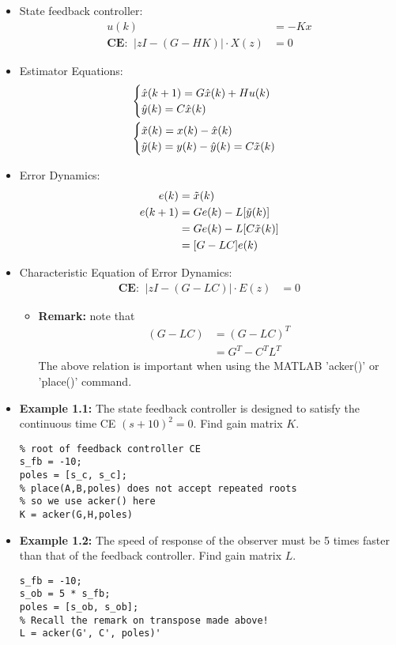 \begin{itemize}
    \item State feedback controller:
    \begin{align*}
        u(k)&=-Kx \\
        \textbf{CE:} \; \; \left|zI-(G-HK)\right|\cdot X(z)&=0
    \end{align*}
    \item Estimator Equations:
    \begin{align*}
        &\begin{cases}
            \hat{x}(k+1) = G \hat{x}(k)+H u(k) \\
            \hat{y}(k) = C \hat{x}(k)
        \end{cases} \\
        &\begin{cases}
            \Tilde{x}(k) = x(k) - \hat{x}(k) \\
            \Tilde{y}(k) = y(k) - \hat{y}(k) = C \Tilde{x}(k)
        \end{cases}
    \end{align*}
    \item Error Dynamics:
    \begin{align*}
        e(k) &= \Tilde{x}(k) \\
        e(k+1) &= G e(k) - L[ \Tilde{y}(k)] \\
        &= Ge(k)-L[C\Tilde{x}(k)] \\
        &= [G-LC]e(k) 
    \end{align*}
    \item Characteristic Equation of Error Dynamics:
    \begin{align*}
        \textbf{CE:}\;\; \left|zI-(G-LC)\right|\cdot E(z)&=0
    \end{align*}
    \begin{itemize}
        \item \textbf{Remark:} note that
        \begin{align*}
            (G-LC) &= (G-LC)^{T} \\
            &= G^T - C^T L^T
        \end{align*}
        The above relation is important when using the MATLAB 'acker()' or 'place()' command.
    \end{itemize}
    \item \textbf{Example 1.1:} The state feedback controller is designed to satisfy the continuous time CE $(s+10)^2=0$. Find gain matrix $K$.
\begin{lstlisting}
% root of feedback controller CE
s_fb = -10;
poles = [s_c, s_c];
% place(A,B,poles) does not accept repeated roots
% so we use acker() here
K = acker(G,H,poles)
\end{lstlisting}
    \item \textbf{Example 1.2:} The speed of response of the observer must be 5 times faster than that of the feedback controller. Find gain matrix $L$.
\begin{lstlisting}
s_fb = -10;
s_ob = 5 * s_fb;
poles = [s_ob, s_ob];
% Recall the remark on transpose made above!
L = acker(G', C', poles)'
\end{lstlisting}
\end{itemize}


